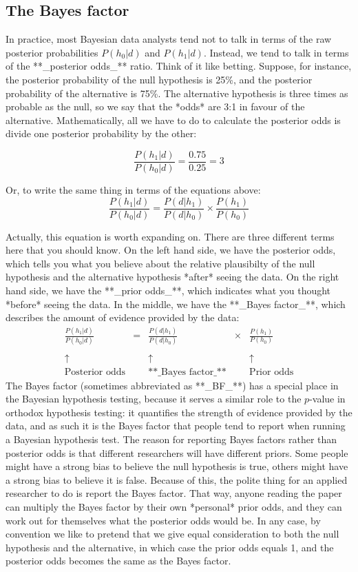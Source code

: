 \subsection{The Bayes factor}

In practice, most Bayesian data analysts tend not to talk in terms of the raw posterior probabilities $P(h_0|d)$ and $P(h_1|d)$. Instead, we tend to talk in terms of the **_posterior odds_** ratio. Think of it like betting. Suppose, for instance, the posterior probability of the null hypothesis is 25\%, and the posterior probability of the alternative is 75\%. The alternative hypothesis is three times as probable as the null, so we say that the *odds* are 3:1 in favour of the alternative. Mathematically, all we have to do to calculate the posterior odds is divide one posterior probability by the other:

$$
\frac{P(h_1 | d)}{P(h_0 | d)} = \frac{0.75}{0.25} = 3
$$


Or, to write the same thing in terms of the equations above:
$$
\frac{P(h_1 | d)}{P(h_0 | d)} = \frac{P(d|h_1)}{P(d|h_0)} \times \frac{P(h_1)}{P(h_0)}
$$

Actually, this equation is worth expanding on. There are three different terms here that you should know. On the left hand side, we have the posterior odds, which tells you what you believe about the relative plausibilty of the null hypothesis and the alternative hypothesis *after* seeing the data. On the right hand side, we have the **_prior odds_**, which indicates what you thought *before* seeing the data. In the middle, we have the **_Bayes factor_**, which describes the amount of evidence provided by the data:
$$
\begin{array}{ccccc}\displaystyle
\frac{P(h_1 | d)}{P(h_0 | d)} &=& \displaystyle\frac{P(d|h_1)}{P(d|h_0)} &\times& \displaystyle\frac{P(h_1)}{P(h_0)} \\[6pt] \\[-2pt]
\uparrow && \uparrow && \uparrow \\[6pt]
\mbox{Posterior odds} && \mbox{**_Bayes factor_**} && \mbox{Prior odds}
\end{array}
$$
The Bayes factor (sometimes abbreviated as **_BF_**) has a special place in the Bayesian hypothesis testing, because it serves a similar role to the $p$-value in orthodox hypothesis testing: it quantifies the strength of evidence provided by the data, and as such it is the Bayes factor that people tend to report when running a Bayesian hypothesis test. The reason for reporting Bayes factors rather than posterior odds is that different researchers will have different priors. Some people might have a strong bias to believe the null hypothesis is true, others might have a strong bias to believe it is false. Because of this, the polite thing for an applied researcher to do is report the Bayes factor. That way, anyone reading the paper can multiply the Bayes factor by their own *personal* prior odds, and they can work out for themselves what the posterior odds would be. In any case, by convention we like to pretend that we give equal consideration to both the null hypothesis and the alternative, in which case the prior odds equals 1, and the posterior odds becomes the same as the Bayes factor.

